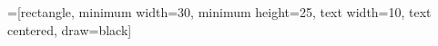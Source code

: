 \newcommand{\keta}[2][]{\vert {#2} \rangle_{#1}}
\newcommand{\braketa}[3][]{\langle {#2} \vert {#3}\rangle_{#1}}

=[rectangle, minimum width=30, minimum height=25, text width=10, text centered, draw=black]